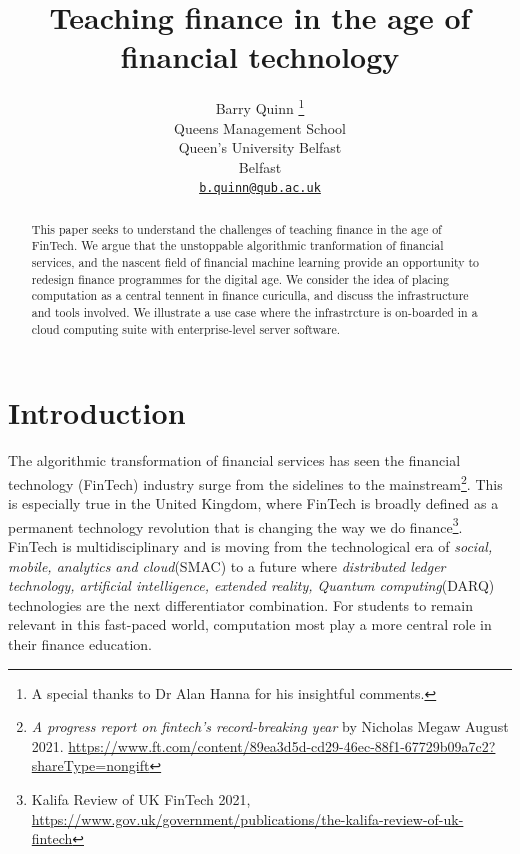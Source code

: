 \documentclass{article}
\title{Teaching finance in the age of financial technology}
\author{
    Barry Quinn
    \thanks{A special thanks to Dr Alan Hanna for his insightful comments.}
   \\
    Queens Management School \\
    Queen's University Belfast \\
  Belfast \\
  \texttt{\href{mailto:b.quinn@qub.ac.uk}{\nolinkurl{b.quinn@qub.ac.uk}}} \\
  }
\begin{document}
\maketitle

\def\tightlist{}


\begin{abstract}
This paper seeks to understand the challenges of teaching finance in the
age of FinTech. We argue that the unstoppable algorithmic tranformation
of financial services, and the nascent field of financial machine
learning provide an opportunity to redesign finance programmes for the
digital age. We consider the idea of placing computation as a central
tennent in finance curiculla, and discuss the infrastructure and tools
involved. We illustrate a use case where the infrastrcture is on-boarded
in a cloud computing suite with enterprise-level server software.
\end{abstract}


\hypertarget{introduction}{%
\section{Introduction}\label{introduction}}

The algorithmic transformation of financial services has seen the
financial technology (FinTech) industry surge from the sidelines to the
mainstream\footnote{\emph{A progress report on fintech's record-breaking
  year} by Nicholas Megaw August 2021.
  \url{https://www.ft.com/content/89ea3d5d-cd29-46ec-88f1-67729b09a7c2?shareType=nongift}}.
This is especially true in the United Kingdom, where FinTech is broadly
defined as a permanent technology revolution that is changing the way we
do finance\footnote{Kalifa Review of UK FinTech 2021,
  \url{https://www.gov.uk/government/publications/the-kalifa-review-of-uk-fintech}}.
FinTech is multidisciplinary and is moving from the technological era of
\emph{social, mobile, analytics and cloud}(SMAC) to a future where
\emph{distributed ledger technology, artificial intelligence, extended
reality, Quantum computing}(DARQ) technologies are the next
differentiator combination. For students to remain relevant in this
fast-paced world, computation most play a more central role in their
finance education.
\end{document}
